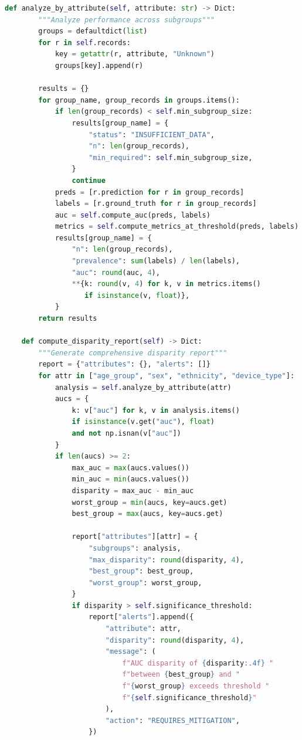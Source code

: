 \begin{lstlisting}[language=Python, caption={의료 AI 하위 그룹 성능 분석기}, label={lst:subgroup_analyzer}]
    def analyze_by_attribute(self, attribute: str) -> Dict:
        """Analyze performance across subgroups"""
        groups = defaultdict(list)
        for r in self.records:
            key = getattr(r, attribute, "Unknown")
            groups[key].append(r)

        results = {}
        for group_name, group_records in groups.items():
            if len(group_records) < self.min_subgroup_size:
                results[group_name] = {
                    "status": "INSUFFICIENT_DATA",
                    "n": len(group_records),
                    "min_required": self.min_subgroup_size,
                }
                continue
            preds = [r.prediction for r in group_records]
            labels = [r.ground_truth for r in group_records]
            auc = self.compute_auc(preds, labels)
            metrics = self.compute_metrics_at_threshold(preds, labels)
            results[group_name] = {
                "n": len(group_records),
                "prevalence": sum(labels) / len(labels),
                "auc": round(auc, 4),
                **{k: round(v, 4) for k, v in metrics.items()
                   if isinstance(v, float)},
            }
        return results

    def compute_disparity_report(self) -> Dict:
        """Generate comprehensive disparity report"""
        report = {"attributes": {}, "alerts": []}
        for attr in ["age_group", "sex", "ethnicity", "device_type"]:
            analysis = self.analyze_by_attribute(attr)
            aucs = {
                k: v["auc"] for k, v in analysis.items()
                if isinstance(v.get("auc"), float)
                and not np.isnan(v["auc"])
            }
            if len(aucs) >= 2:
                max_auc = max(aucs.values())
                min_auc = min(aucs.values())
                disparity = max_auc - min_auc
                worst_group = min(aucs, key=aucs.get)
                best_group = max(aucs, key=aucs.get)

                report["attributes"][attr] = {
                    "subgroups": analysis,
                    "max_disparity": round(disparity, 4),
                    "best_group": best_group,
                    "worst_group": worst_group,
                }
                if disparity > self.significance_threshold:
                    report["alerts"].append({
                        "attribute": attr,
                        "disparity": round(disparity, 4),
                        "message": (
                            f"AUC disparity of {disparity:.4f} "
                            f"between {best_group} and "
                            f"{worst_group} exceeds threshold "
                            f"{self.significance_threshold}"
                        ),
                        "action": "REQUIRES_MITIGATION",
                    })


\end{lstlisting}
